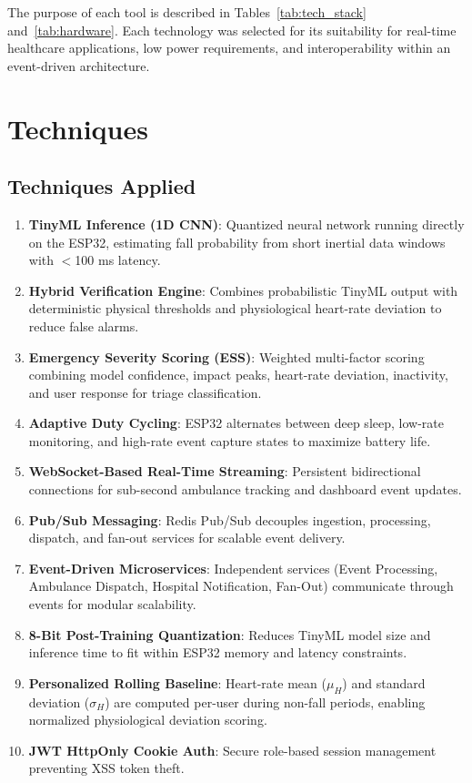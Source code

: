 The purpose of each tool is described in Tables~\ref{tab:tech_stack} and~\ref{tab:hardware}. Each technology was selected for its suitability for real-time healthcare applications, low power requirements, and interoperability within an event-driven architecture.

\section[Techniques]{\textbf{Techniques}}

\subsection{Techniques Applied}

\begin{enumerate}
\item \textbf{TinyML Inference (1D CNN)}: Quantized neural network running directly on the ESP32, estimating fall probability from short inertial data windows with $<$100 ms latency.
\item \textbf{Hybrid Verification Engine}: Combines probabilistic TinyML output with deterministic physical thresholds and physiological heart-rate deviation to reduce false alarms.
\item \textbf{Emergency Severity Scoring (ESS)}: Weighted multi-factor scoring combining model confidence, impact peaks, heart-rate deviation, inactivity, and user response for triage classification.
\item \textbf{Adaptive Duty Cycling}: ESP32 alternates between deep sleep, low-rate monitoring, and high-rate event capture states to maximize battery life.
\item \textbf{WebSocket-Based Real-Time Streaming}: Persistent bidirectional connections for sub-second ambulance tracking and dashboard event updates.
\item \textbf{Pub/Sub Messaging}: Redis Pub/Sub decouples ingestion, processing, dispatch, and fan-out services for scalable event delivery.
\item \textbf{Event-Driven Microservices}: Independent services (Event Processing, Ambulance Dispatch, Hospital Notification, Fan-Out) communicate through events for modular scalability.
\item \textbf{8-Bit Post-Training Quantization}: Reduces TinyML model size and inference time to fit within ESP32 memory and latency constraints.
\item \textbf{Personalized Rolling Baseline}: Heart-rate mean ($\mu_H$) and standard deviation ($\sigma_H$) are computed per-user during non-fall periods, enabling normalized physiological deviation scoring.
\item \textbf{JWT HttpOnly Cookie Auth}: Secure role-based session management preventing XSS token theft.
\end{enumerate}

